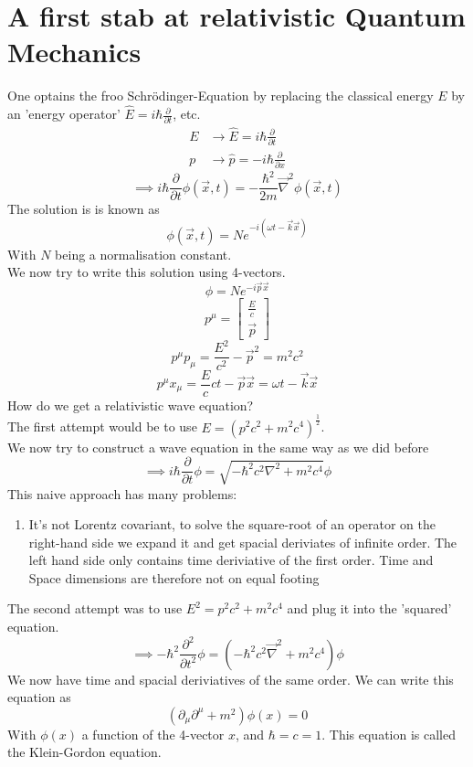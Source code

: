 \documentclass{report}
\begin{document}
\chapter{A first stab at relativistic Quantum Mechanics}
One optains the froo Schrödinger-Equation by replacing the classical energy $E$ by an 'energy operator' $\hat{E} = i \hbar \frac{\partial }{\partial t}  $, etc. 
\begin{align*}
	E &\to \hat{E} = i\hbar \frac{\partial }{\partial t} \\
	p &\to \hat{p} = -i\hbar \frac{\partial }{\partial x}    
\end{align*}
\[
\implies i\hbar \frac{\partial }{\partial t} \phi\left( \vec{x}, t \right) = -\frac{\hbar^2}{2m} \vec{\nabla }^2 \phi\left( \vec{x}, t \right)  
\] The solution is is known as \[
\phi(\vec{x}, t) = N e^{-i\left( \omega t - \vec{k}\vec{x} \right) }
\] With $N$ being a normalisation constant.\\
We now try to write this solution using 4-vectors. \[
	\phi = N e^{-i \vec{p} \vec{x}}
\] 
\[
	p^\mu = \begin{bmatrix} \frac{E}{c} \\ \vec{p} \end{bmatrix} 
\] \[
p^\mu p_\mu = \frac{E^2}{c^2} - \vec{p}^2 = m^2 c^2
\] \[
p^\mu x_\mu = \frac{E}{c} ct - \vec{p} \vec{x} = \omega t - \vec{k} \vec{x}
\] 
How do we get a relativistic wave equation?\\
The first attempt would be to use $E = \left( p^2c^2 + m^2c^4 \right)^{\frac{1}{2}} $.\\
We now try to construct a wave equation in the same way as we did before \[
\implies i \hbar \frac{\partial }{\partial t} \phi = \sqrt{-\hbar^2 c^2 \nabla^2 + m^2 c^4 } \phi 
\] This naive approach has many problems:
\begin{enumerate}
	\item It's not Lorentz covariant, to solve the square-root of an operator on the right-hand side we expand it and get spacial deriviates of infinite order. The left hand side only contains time deriviative of the first order. Time and Space dimensions are therefore not on equal footing
\end{enumerate}
The second attempt was to use $E^2 = p^2 c^2 + m^2 c^4$ and plug it into the 'squared' equation. \[
	\implies -\hbar^2 \frac{\partial^2}{\partial t^2} \phi = \left( - \hbar^2 c^2 \vec{\nabla }^2 + m^2 c^4 \right) \phi  
\] We now have time and spacial deriviatives of the same order. We can write this equation as \[
\left( \partial_\mu \partial^\mu + m^2   \right) \phi(x) = 0
\] With $\phi(x)$ a function of the 4-vector $x$, and $\hbar = c = 1$. This equation is called the Klein-Gordon equation.
\end{document}
